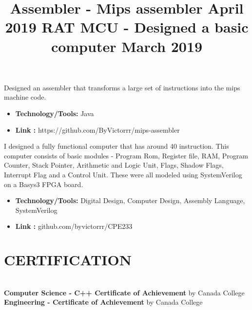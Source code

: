 \documentclass[margin]{res}
\begin{document}
\begin{resume}
{%
\location{}
\title{\textbf{Assembler - Mips assembler \hfill April 2019}}
\begin{position}
Designed an assembler that transforms a large set of instructions into the mips machine code.
\begin{itemize}
\item \textbf{Technology/Tools:} Java
\end{itemize}
\begin{itemize}
\item \textbf{Link :} https://github.com/ByVictorrr/mips-assembler
\end{itemize}
\end{position}

\location{}
\title{\textbf{ RAT MCU - Designed a basic computer  \hfill March 2019}}
\begin{position}
I designed a fully functional computer that has around 40 instruction. This computer consists of basic modules - Program Rom, Register file, RAM, Program Counter, Stack Pointer, Arithmetic and Logic Unit, Flags, Shadow Flags, Interrupt Flag and a Control Unit. These were all modeled using SystemVerilog on a Basys3 FPGA board. 
\begin{itemize}
\item \textbf{Technology/Tools:} Digital Design, Computer Design, Assembly Language, SystemVerilog
\end{itemize}
\begin{itemize}
\item \textbf{Link :} github.com/byvictorrr/CPE233
\end{itemize}
\end{position}




\section{CERTIFICATION}
\par
\normalfont{}
\\
\normalfont{}\textbullet{} \textbf{Computer Science - C++ Certificate of Achievement} by Canada College
\\ 
\textbullet{} \textbf{Engineering - Certificate of Achievement} by Canada College 


}
\end{resume}
\end{document}
